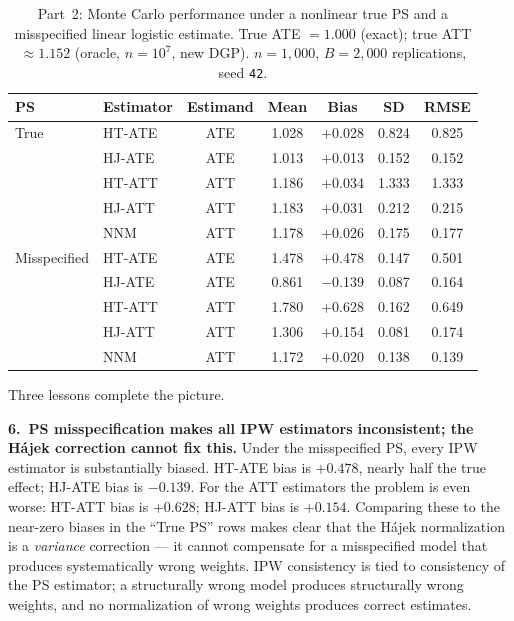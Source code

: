 \documentclass[master.tex]{subfiles}
\begin{document}
\begin{table}[h]
\centering
\renewcommand{\arraystretch}{1.5}
\caption{Part~2: Monte Carlo performance under a nonlinear true PS and
  a misspecified linear logistic estimate.  True ATE $= 1.000$ (exact);
  true ATT $\approx 1.152$ (oracle, $n=10^7$, new DGP).
  $n = 1{,}000$, $B = 2{,}000$ replications, seed \texttt{42}.}
\label{w6:tab:lab2}
\begin{tabular}{llccccc}
\toprule
\textbf{PS} & \textbf{Estimator} & \textbf{Estimand}
  & \textbf{Mean} & \textbf{Bias} & \textbf{SD} & \textbf{RMSE} \\
\midrule
True
  & HT-ATE  & ATE & 1.028 & $+$0.028 & 0.824 & 0.825 \\
  & HJ-ATE  & ATE & 1.013 & $+$0.013 & 0.152 & 0.152 \\[3pt]
  & HT-ATT  & ATT & 1.186 & $+$0.034 & 1.333 & 1.333 \\
  & HJ-ATT  & ATT & 1.183 & $+$0.031 & 0.212 & 0.215 \\
  & NNM     & ATT & 1.178 & $+$0.026 & 0.175 & 0.177 \\
\midrule
Misspecified
  & HT-ATE  & ATE & 1.478 & $+$0.478 & 0.147 & 0.501 \\
  & HJ-ATE  & ATE & 0.861 & $-$0.139 & 0.087 & 0.164 \\[3pt]
  & HT-ATT  & ATT & 1.780 & $+$0.628 & 0.162 & 0.649 \\
  & HJ-ATT  & ATT & 1.306 & $+$0.154 & 0.081 & 0.174 \\
  & NNM     & ATT & 1.172 & $+$0.020 & 0.138 & 0.139 \\
\bottomrule
\end{tabular}
\end{table}

\medskip
Three lessons complete the picture.

\medskip
\noindent\textbf{6.\ PS misspecification makes all IPW estimators
inconsistent; the Hájek correction cannot fix this.}
Under the misspecified PS, every IPW estimator is substantially biased.
HT-ATE bias is $+0.478$, nearly half the true effect; HJ-ATE bias is
$-0.139$.  For the ATT estimators the problem is even worse: HT-ATT
bias is $+0.628$; HJ-ATT bias is $+0.154$.  Comparing these to the
near-zero biases in the ``True PS'' rows makes clear that the Hájek
normalization is a \emph{variance} correction --- it cannot compensate
for a misspecified model that produces systematically wrong weights.
IPW consistency is tied to consistency of the PS estimator; a
structurally wrong model produces structurally wrong weights, and no
normalization of wrong weights produces correct estimates.
\end{document}
